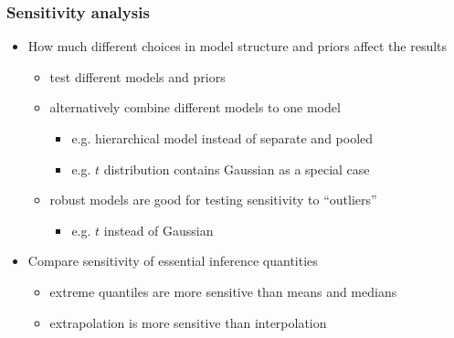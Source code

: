 \documentclass[10pt,handout]{beamer}
\begin{document}
\begin{frame}

\frametitle{Sensitivity analysis}

  \begin{itemize}
  \item How much different choices in model structure and priors affect the results
    \begin{itemize}
      \item<2-> test different models and priors
      \item<3-> alternatively combine different models to one model
        \begin{itemize}
        \item e.g. hierarchical model instead of separate and pooled
        \item e.g. $t$ distribution contains Gaussian as a special case
      \end{itemize}
      \item<3-> robust models are good for testing sensitivity to ``outliers''
        \begin{itemize}
        \item e.g. $t$ instead of Gaussian
        \end{itemize}
    \end{itemize}
    \item<4-> Compare sensitivity of essential inference quantities
      \begin{itemize}
      \item extreme quantiles are more sensitive than means and medians
      \item extrapolation is more sensitive than interpolation
      \end{itemize}
    \end{itemize}

\end{frame}
\end{document}
